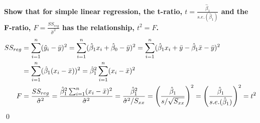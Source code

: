 \documentclass[10pt]{report}
\DeclarePairedDelimiter\autoparen{(}{)}
\newcommand{\pa}[1]{\autoparen*{#1}}
\begin{document}
{\large\bf Show that for simple linear regression, the t-ratio, $t=\frac{\hat{\beta}_1}{s.e.(\hat{\beta}_1)}$ and the F-ratio, $F=\frac{SS_{reg}}{\hat{\sigma}^2}$ has the relationship, $t^2=F$.}
\begin{align*}
	SS_{reg}
	&= \sum_{i=1}^{n} (\hat{y}_i - \bar{y})^2 
	= \sum_{i=1}^{n} (\hat{\beta}_1 x_i + \hat{\beta}_0 - \bar{y})^2 
	= \sum_{i=1}^{n} (\hat{\beta}_1 x_i + \bar{y} - \hat{\beta}_1 \bar{x} - \bar{y})^2\\
	&= \sum_{i=1}^{n} (\hat{\beta}_1 (x_i - \bar{x}))^2
	= \hat{\beta}_1^2 \sum_{i=1}^{n} (x_i - \bar{x})^2\\
	F
	&= \frac{SS_{reg}}{\hat{\sigma}^2}
	= \frac{\hat{\beta}_1^2 \sum_{i=1}^{n} (x_i - \bar{x})^2}{\hat{\sigma}^2}
	= \frac{\hat{\beta}_1^2}{\hat{\sigma}^2/S_{xx}}
	= \pa{\frac{\hat{\beta}_1}{s/\sqrt{S_{xx}}}}^2
	= \pa{\frac{\hat{\beta}_1}{s.e.(\hat{\beta}_1)}}^2
	= t^2
\end{align*}
\qed
\end{document}
